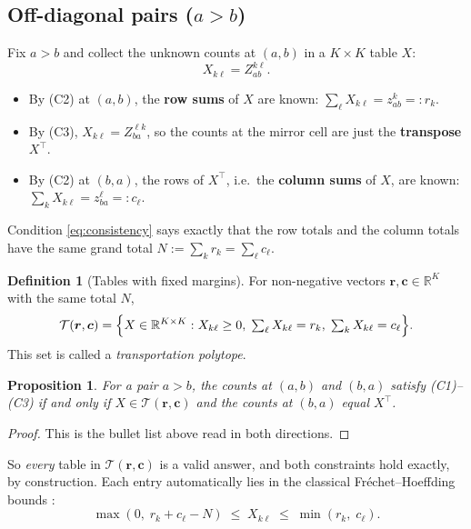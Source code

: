 \documentclass[11pt,a4paper]{article}
\newtheorem{proposition}{Proposition}
\theoremstyle{definition}
\newtheorem{definition}{Definition}
\theoremstyle{remark}
\newcommand{\R}{\mathbb{R}}
\newcommand{\T}{\mathcal{T}}
\begin{document}
\subsection{Off-diagonal pairs ($a>b$)}

Fix $a > b$ and collect the unknown counts at $(a,b)$ in a $K\times K$
table $X$:
\begin{equation}
  X_{k\ell} = Z^{k\ell}_{ab}.
\end{equation}
\begin{itemize}
  \item By (C2) at $(a,b)$, the \textbf{row sums} of $X$ are known:
        $\sum_{\ell} X_{k\ell} = z^{k}_{ab} =: r_k$.
  \item By (C3), $X_{k\ell} = Z^{\ell k}_{ba}$, so the counts at the mirror
        cell are just the \textbf{transpose} $X^{\top}$.
  \item By (C2) at $(b,a)$, the rows of $X^{\top}$, i.e.\ the
        \textbf{column sums} of $X$, are known:
        $\sum_{k} X_{k\ell} = z^{\ell}_{ba} =: c_\ell$.
\end{itemize}
Condition \eqref{eq:consistency} says exactly that the row totals and the
column totals have the same grand total $N := \sum_k r_k = \sum_\ell c_\ell$.

\begin{definition}[Tables with fixed margins]
For non-negative vectors $\bm r, \bm c \in \R^{K}$ with the same total $N$,
\begin{equation}
  \T(\bm r,\bm c) = \Bigl\{ X \in \R^{K\times K} :
    X_{k\ell} \ge 0,\;
    \textstyle\sum_{\ell} X_{k\ell} = r_k,\;
    \sum_{k} X_{k\ell} = c_\ell \Bigr\}.
\end{equation}
This set is called a \emph{transportation polytope}.
\end{definition}

\begin{proposition}
\label{prop:equiv}
For a pair $a>b$, the counts at $(a,b)$ and $(b,a)$ satisfy (C1)--(C3) if and
only if $X \in \T(\bm r,\bm c)$ and the counts at $(b,a)$ equal $X^{\top}$.
\end{proposition}
\begin{proof}
This is the bullet list above read in both directions.
\end{proof}

So \emph{every} table in $\T(\bm r,\bm c)$ is a valid answer, and both
constraints hold exactly, by construction. Each entry automatically lies in
the classical Fr\'echet--Hoeffding bounds
\citep{hoeffding1940masstabinvariante,frechet1951tableaux}:
\begin{equation}
  \max(0,\; r_k + c_\ell - N) \;\le\; X_{k\ell} \;\le\; \min(r_k,\; c_\ell).
\end{equation}
\end{document}
